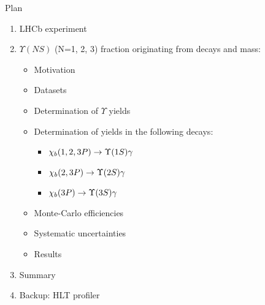 \begin{frame}{Plan}
\begin{enumerate}
\item LHCb experiment
\item $\Upsilon(NS)$ (N=1, 2, 3) fraction  originating from \chib decays and \chibThreeP mass:
\begin{itemize}
\item Motivation
\item Datasets
\item Determination of $\Upsilon$ yields
\item Determination of \chib yields in the following decays:
\begin{itemize}
    \item $\chi_b(1,2,3P) \to \OneS \gamma$
    \item $\chi_b(2,3P) \to \TwoS \gamma$
    \item $\chi_b(3P) \to \ThreeS \gamma$
\end{itemize}
\item Monte-Carlo efficiencies
\item Systematic uncertainties 
\item Results
\end{itemize}
\item Summary
\item Backup: HLT profiler

\end{enumerate}
\end{frame}
